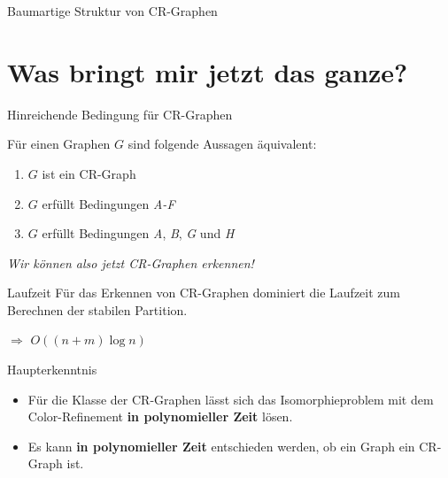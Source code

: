 \documentclass{beamer}
\begin{document}
\begin{frame}{Baumartige Struktur von CR-Graphen}
	\end{frame}
	
	\section{Was bringt mir jetzt das ganze?}
	\begin{frame}{Hinreichende Bedingung für CR-Graphen}
		\begin{Theorem}
			Für einen Graphen $G$ sind folgende Aussagen äquivalent:
			
			\begin{enumerate}[label=(\alph*)]
				\item $G$ ist ein CR-Graph
				\item $G$ erfüllt Bedingungen \emph{A-F}
				\item $G$ erfüllt Bedingungen \emph{A}, \emph{B}, \emph{G} und \emph{H}
			\end{enumerate}
		\end{Theorem}
		\pause
		
		\alert{\Large{\textit{Wir können also jetzt CR-Graphen erkennen!}}}
	\end{frame}
	\begin{frame}{Laufzeit}
		Für das Erkennen von CR-Graphen dominiert die Laufzeit zum Berechnen der stabilen Partition.
		
		$\Rightarrow$ $O((n+m)\log n)$
	\end{frame}
	\begin{frame}{Haupterkenntnis}
		\begin{itemize}
			\item Für die Klasse der CR-Graphen lässt sich das Isomorphieproblem mit dem Color-Refinement \alert{\textbf{in polynomieller Zeit}} lösen.
			\item Es kann \alert{\textbf{in polynomieller Zeit}} entschieden werden, ob ein Graph ein CR-Graph ist.
		\end{itemize}
	\end{frame}
\end{document}
